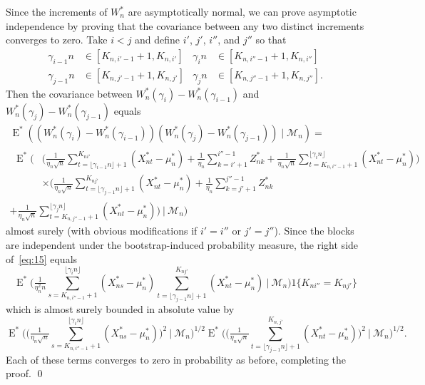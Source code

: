 \documentclass[11pt]{article}
\theoremstyle{definition}
\DeclareMathOperator{\E}{E}
\begin{document}
  Since the increments of $W_n^{*}$ are asymptotically normal, we can
  prove asymptotic independence by proving that the covariance between
  any two distinct increments converges to zero.  Take $i < j$ and
  define $i'$, $j'$, $i''$, and $j''$ so that
  \begin{align*}
    \gamma_{i-1} n &\in [K_{n,i'-1}+1,K_{n,i'}] & \gamma_{i} n &\in [K_{n,i''-1}+1,K_{n,i''}]\\
    \gamma_{j-1} n &\in [K_{n,j'-1}+1,K_{n,j'}] & \gamma_{j} n &\in [K_{n,j''-1}+1,K_{n,j''}].
  \end{align*}
  Then the covariance between $W_n^*(\gamma_i) - W_n^*(\gamma_{i-1})$
  and $W_n^*(\gamma_j) - W_n^*(\gamma_{j-1})$ equals
  \begin{multline}\label{eq:15}
    \E^*((W_n^*(\gamma_i) - W_n^*(\gamma_{i-1}))
    (W_n^*(\gamma_j) - W_n^*(\gamma_{j-1}))\mid \mathcal{M}_n) =\\
    \begin{split}
      \E^*\Big(&\Big(\tfrac{1}{\eta_n\sqrt{n}} \sum_{t=\lfloor \gamma_{i-1} n \rfloor + 1}^{K_{ni'}} (X_{nt}^{*} - \mu_n^{*}) 
    + \tfrac{1}{\eta_n} \sum_{k=i'+1}^{i''-1} Z_{nk}^{*} + \tfrac{1}{\eta_n \sqrt{n}} \sum_{t=K_{n,i''-1}+1}^{\lfloor \gamma_i n \rfloor} (X_{nt}^{*} - \mu_n^{*})\Big) \\
    &
      \times \Big(\tfrac{1}{\eta_n\sqrt{n}} \sum_{t=\lfloor \gamma_{j-1} n \rfloor + 1}^{K_{nj'}} (X_{nt}^{*} - \mu_n^{*}) 
    + \tfrac{1}{\eta_n} \sum_{k=j'+1}^{j''-1} Z_{nk}^{*} 
  \end{split}\\
  + \tfrac{1}{\eta_n \sqrt{n}} \sum_{t=K_{n,j''-1}+1}^{\lfloor
    \gamma_j n \rfloor} (X_{nt}^{*} - \mu_n^{*})\Big) \ \Big|\
  \mathcal{M}_n \Big)
\end{multline}
  almost surely (with obvious modifications if $i' = i''$ or $j' =
  j''$).  Since the blocks are independent under the bootstrap-induced
  probability measure, the right side of~\eqref{eq:15} equals
  \begin{equation*}
    \E^{*}\Big( \tfrac{1}{\eta_n^2 n} \sum_{s=K_{n,i''-1}+1}^{\lfloor \gamma_i n \rfloor} (X_{ns}^{*} - \mu_n^{*})
    \sum_{t=\lfloor \gamma_{j-1} n \rfloor + 1}^{K_{nj'}} (X_{nt}^{*} - \mu_n^{*}) \ \Big|\ \mathcal{M}_n\Big) 1\{K_{ni''} = K_{nj'} \}
  \end{equation*}
  which is almost surely bounded in absolute value by
  \begin{equation*}
     \E^{*}\Big(\Big( \tfrac{1}{\eta_n \sqrt{n}} \sum_{s=K_{n,i''-1}+1}^{\lfloor \gamma_i n \rfloor} (X_{ns}^{*} - \mu_n^{*})\Big)^2 \ \Big|\ \mathcal{M}_n\Big)^{1/2}
     \E^{*}\Big(\Big( \tfrac{1}{\eta_n \sqrt{n}} \sum_{t=\lfloor \gamma_{j-1} n \rfloor+1}^{K_{n,j'}} (X_{nt}^{*} - \mu_n^{*})\Big)^2 \ \Big|\ \mathcal{M}_n\Big)^{1/2}.
  \end{equation*}
  Each of these terms converges to zero in probability as before, completing the proof.
 \qed
\end{document}
